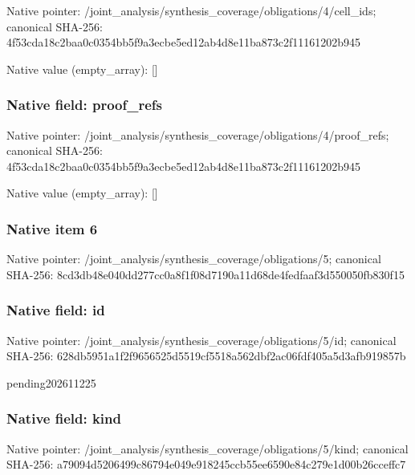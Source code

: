 \documentclass[10pt,a4paper]{article}
\begin{document}
Native pointer: /joint\_analysis/synthesi\allowbreak{}s\_coverage/obligations/4\allowbreak{}/cell\_ids; canonical SHA-256: 4f53cda18c2baa0c0354bb5f\allowbreak{}9a3ecbe5ed12ab4d8e11ba87\allowbreak{}3c2f11161202b945



Native value (empty\_array): []



\subsubsection{Native field: proof\_refs}


Native pointer: /joint\_analysis/synthesi\allowbreak{}s\_coverage/obligations/4\allowbreak{}/proof\_refs; canonical SHA-256: 4f53cda18c2baa0c0354bb5f\allowbreak{}9a3ecbe5ed12ab4d8e11ba87\allowbreak{}3c2f11161202b945



Native value (empty\_array): []



\subsubsection{Native item 6}


Native pointer: /joint\_analysis/synthesi\allowbreak{}s\_coverage/obligations/5; canonical SHA-256: 8cd3db48e040dd277cc0a8f1\allowbreak{}f08d7190a11d68de4fedfaaf\allowbreak{}3d550050fb830f15



\subsubsection{Native field: id}


Native pointer: /joint\_analysis/synthesi\allowbreak{}s\_coverage/obligations/5\allowbreak{}/id; canonical SHA-256: 628db5951a1f2f9656525d55\allowbreak{}19cf5518a562dbf2ac06fdf4\allowbreak{}05a5d3afb919857b


pending202611225


\subsubsection{Native field: kind}


Native pointer: /joint\_analysis/synthesi\allowbreak{}s\_coverage/obligations/5\allowbreak{}/kind; canonical SHA-256: a79094d5206499c86794e049\allowbreak{}e918245ccb55ee6590e84c27\allowbreak{}9e1d00b26cceffc7
\end{document}
